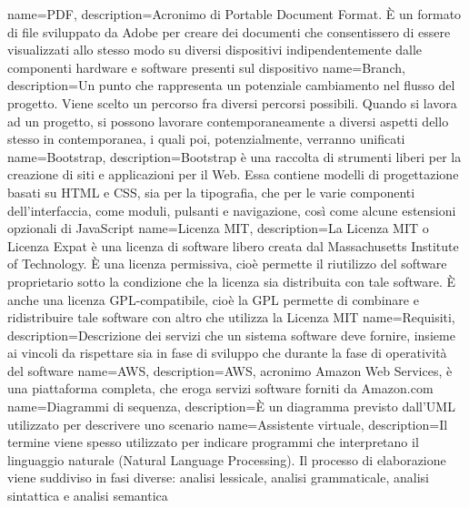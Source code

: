  {
	name=PDF,
	description={Acronimo di Portable Document Format. È un formato di file sviluppato da Adobe per creare dei documenti che consentissero di essere visualizzati allo stesso modo su diversi dispositivi indipendentemente dalle componenti hardware e software presenti sul dispositivo}
}
 {
	name=Branch,
	description={Un punto che rappresenta un potenziale cambiamento nel flusso del progetto. Viene scelto un percorso fra diversi percorsi possibili. Quando si lavora ad un progetto, si possono lavorare contemporaneamente a diversi aspetti dello stesso in contemporanea, i quali poi, potenzialmente, verranno unificati}
}
 {
	name=Bootstrap,
	description={Bootstrap è una raccolta di strumenti liberi per la creazione di siti e applicazioni per il Web. Essa contiene modelli di progettazione basati su HTML e CSS, sia per la tipografia, che per le varie componenti dell'interfaccia, come moduli, pulsanti e navigazione, così come alcune estensioni opzionali di JavaScript}
}
 {
	name=Licenza MIT,
	description={La Licenza MIT  o Licenza Expat è una licenza di software libero creata dal Massachusetts Institute of Technology. È una licenza permissiva, cioè permette il riutilizzo del software proprietario sotto la condizione che la licenza sia distribuita con tale software. È anche una licenza GPL-compatibile, cioè la GPL permette di combinare e ridistribuire tale software con altro che utilizza la Licenza MIT}
}
 {
	name=Requisiti,
	description={Descrizione dei servizi che un sistema software deve fornire, insieme ai vincoli da rispettare sia in fase di sviluppo che durante la fase di operatività del software}
}
 {
	name=AWS,
	description={AWS, acronimo Amazon Web Services, è una piattaforma completa, che eroga servizi software forniti da Amazon.com}
}
 {
	name=Diagrammi di sequenza,
	description={È un diagramma previsto dall'UML utilizzato per descrivere uno scenario}
}
 {
	name=Assistente virtuale,
	description={Il termine viene spesso utilizzato per indicare programmi che interpretano il linguaggio naturale (Natural Language Processing). Il processo di elaborazione viene suddiviso in fasi diverse: analisi lessicale, analisi grammaticale, analisi sintattica e analisi semantica}
}
